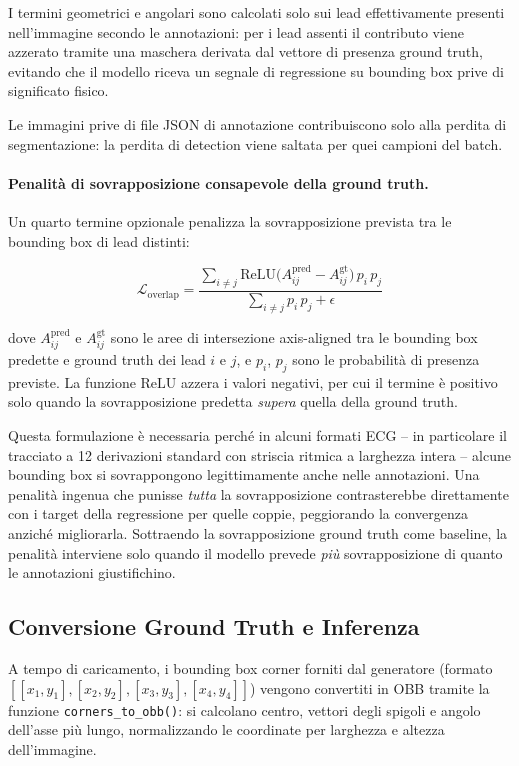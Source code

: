 I termini geometrici e angolari sono calcolati solo sui lead effettivamente presenti nell'immagine secondo le annotazioni: per i lead assenti il contributo viene azzerato tramite una maschera derivata dal vettore di presenza ground truth, evitando che il modello riceva un segnale di regressione su bounding box prive di significato fisico.

Le immagini prive di file JSON di annotazione contribuiscono solo alla perdita di segmentazione: la perdita di detection viene saltata per quei campioni del batch.

\paragraph{Penalità di sovrapposizione consapevole della ground truth.}
Un quarto termine opzionale penalizza la sovrapposizione prevista tra le bounding box di lead distinti:

\[
    \mathcal{L}_{\text{overlap}} = \frac{\displaystyle\sum_{i \neq j} \mathrm{ReLU}\bigl(A^{\text{pred}}_{ij} - A^{\text{gt}}_{ij}\bigr)\, p_i\, p_j}{\displaystyle\sum_{i \neq j} p_i\, p_j + \epsilon}
\]

dove $A^{\text{pred}}_{ij}$ e $A^{\text{gt}}_{ij}$ sono le aree di intersezione axis-aligned tra le bounding box predette e ground truth dei lead $i$ e $j$, e $p_i$, $p_j$ sono le probabilità di presenza previste. La funzione $\mathrm{ReLU}$ azzera i valori negativi, per cui il termine è positivo solo quando la sovrapposizione predetta \emph{supera} quella della ground truth.

Questa formulazione è necessaria perché in alcuni formati ECG -- in particolare il tracciato a 12 derivazioni standard con striscia ritmica a larghezza intera -- alcune bounding box si sovrappongono legittimamente anche nelle annotazioni. Una penalità ingenua che punisse \emph{tutta} la sovrapposizione contrasterebbe direttamente con i target della regressione per quelle coppie, peggiorando la convergenza anziché migliorarla. Sottraendo la sovrapposizione ground truth come baseline, la penalità interviene solo quando il modello prevede \emph{più} sovrapposizione di quanto le annotazioni giustifichino.

\subsection{Conversione Ground Truth e Inferenza}

A tempo di caricamento, i bounding box corner forniti dal generatore (formato $[[x_1,y_1],[x_2,y_2],[x_3,y_3],[x_4,y_4]]$) vengono convertiti in OBB tramite la funzione \texttt{corners\_to\_obb()}: si calcolano centro, vettori degli spigoli e angolo dell'asse più lungo, normalizzando le coordinate per larghezza e altezza dell'immagine.

